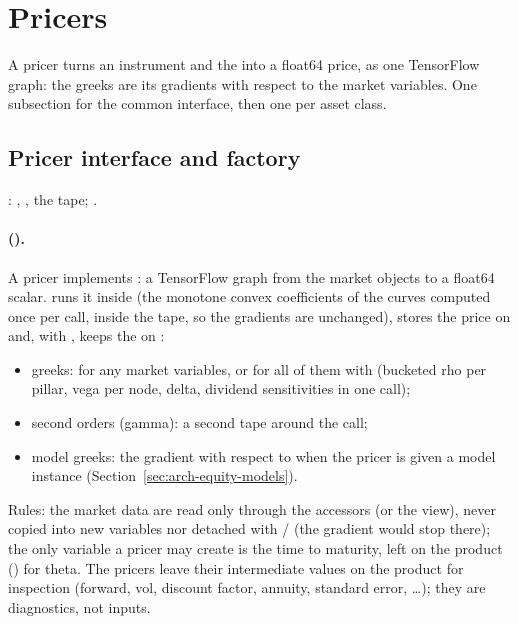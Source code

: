 \section{Pricers}\label{sec:arch-pricers-chapter}
A pricer turns an instrument and the  into a float64 price, as one TensorFlow graph: the greeks
are its gradients with respect to the market variables. One subsection for the common interface, then one per asset
class.

\subsection{Pricer interface and factory}\label{sec:arch-pricers}
: , , the tape; .

\paragraph{ ().} A pricer implements : a TensorFlow graph from the market objects to a float64 scalar.  runs it inside  (the monotone convex coefficients of the curves computed
once per call, inside the tape, so the gradients are unchanged), stores the price on  and, with
, keeps the  on :
\begin{itemize}[nosep]
  \item greeks:  for any market variables, or for all of them
        with  (bucketed rho per pillar, vega per node, delta, dividend
        sensitivities in one call);
  \item second orders (gamma): a second tape around the call;
  \item model greeks: the gradient with respect to  when the pricer is given a model instance
        (Section~\ref{sec:arch-equity-models}).
\end{itemize}
Rules: the market data are read only through the  accessors (or the  view), never
copied into new variables nor detached with  /  (the gradient would stop there); the only
variable a pricer may create is the time to maturity, left on the product () for
theta. The pricers leave their intermediate values on the product for inspection (forward, vol, discount factor,
annuity, standard error, \dots); they are diagnostics, not inputs.

